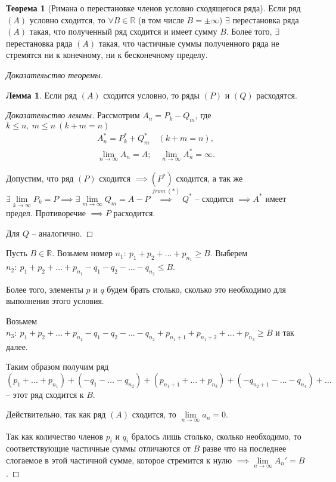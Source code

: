 \documentclass{report}
\theoremstyle{definition}
\newtheorem{lemma}{Лемма}[section]
\newtheorem{theorem}{Теорема}[section]
\begin{document}
\begin{theorem}[Римана о перестановке членов условно сходящегося ряда]
  Если ряд $(A)$ условно сходится, то $\forall B \in \mathbb{R}$ (в том числе $B = \pm\infty$) $\exists$ перестановка ряда $(A)$ такая, что полученный ряд сходится и имеет сумму $B$. Более того, $\exists$ перестановка ряда $(A)$ такая, что частичные суммы полученного ряда не стремятся ни к конечному, ни к бесконечному пределу.
\end{theorem}

\begin{proof}[Доказательство теоремы]
  \begin{lemma}
    Если ряд $(A)$ сходится условно, то ряды $(P)$ и $(Q)$ расходятся.
  \end{lemma}

  \begin{proof}[Доказательство леммы]
    Рассмотрим $A_n = P_k - Q_m$, где $k \leqslant n, \ m \leqslant n \ (k + m = n)$
    \begin{eqnarray*}
      A_n^* = P_k^* + Q_m^* \quad (k + m = n), \\
      \underset{n\rightarrow\infty}{\lim} A_n = A; \quad \underset{n\rightarrow\infty}{\lim}A_n^* = \infty.
    \end{eqnarray*}

    Допустим, что ряд $(P)$ сходится $\implies (P^*)$ сходится, а так же $\exists \underset{k\rightarrow\infty}{\lim}P_k = P \implies \exists\underset{m\rightarrow\infty}{\lim}Q_m = A - P \overset{from \ (*)}{\implies} Q^*$ -- сходится $\implies A^*$ имеет предел. Противоречие $\implies P$ расходится.

    Для $Q$ -- аналогично.
  \end{proof}

  Пусть $B \in \mathbb{R}$. Возьмем номер $n_1: \ p_1 + p_2 + \ldots + p_{n_1} \geqslant B$. Выберем $n_2: \ p_1 + p_2 + \ldots + p_{n_1} - q_1 - q_2 - \ldots - q_{n_2} \leqslant B$.

  Более того, элементы $p$ и $q$ будем брать столько, сколько это необходимо для выполнения этого условия.

  Возьмем $n_3: \ p_1 + p_2 + \ldots + p_{n_1} - q_1 - q_2 - \ldots - q_{n_2} + p_{n_1 + 1} + p_{n_1 + 2} + \ldots + p_{n_3} \geqslant B$ и так далее.

  Таким образом получим ряд $(p_1 + \ldots + p_{n_1}) + (-q_1 - \ldots - q_{n_2}) + (p_{n_1 + 1} + \ldots + p_{n_3}) + (-q_{n_2 + 1} - \ldots - q_{n_4}) + \ldots$ -- этот ряд сходится к $B$.

  Действительно, так как ряд $(A)$ сходится, то $\underset{n\rightarrow\infty}{\lim} a_n = 0$.

  Так как количество членов $p_i$ и $q_i$ бралось лишь столько, сколько необходимо, то соответствующие частичные суммы отличаются от $B$ разве что на последнее слогаемое в этой частичной сумме, которое стремится к нулю $\implies \underset{n\rightarrow\infty}{\lim}A_n' = B$.
\end{proof}
\end{document}
